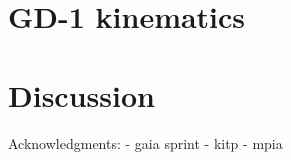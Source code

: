 \documentclass[twocolumn]{aastex63}
\begin{document}
\section{GD-1 kinematics}
\label{sec:kinematics}




\section{Discussion}
\label{sec:discussion}


Acknowledgments: 
- gaia sprint
- kitp
- mpia



\end{document}
